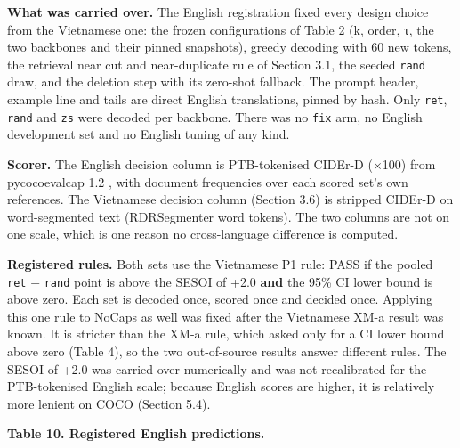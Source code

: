 \documentclass[manuscript,screen]{acmart}
\begin{document}
\textbf{What was carried over.} The English registration fixed every design choice from the
Vietnamese one: the frozen configurations of Table 2 (k, order, τ, the two backbones and their
pinned snapshots), greedy decoding with 60 new tokens, the retrieval near cut and near-duplicate
rule of Section 3.1, the seeded \texttt{rand} draw, and the deletion step with its zero-shot
fallback. The prompt header, example line and tails are direct English translations, pinned by hash.
Only \texttt{ret}, \texttt{rand} and \texttt{zs} were decoded per backbone. There was no
\texttt{fix} arm, no English development set and no English tuning of any kind.

\textbf{Scorer.} The English decision column is PTB-tokenised CIDEr-D (×100) from pycocoevalcap 1.2
\citep{Chen2015COCOCaptions}, with document frequencies over each scored set's own references. The
Vietnamese decision column (Section 3.6) is stripped CIDEr-D on word-segmented text (RDRSegmenter
word tokens). The two columns are not on one scale, which is one reason no cross-language difference
is computed.

\textbf{Registered rules.} Both sets use the Vietnamese P1 rule: PASS if the pooled \texttt{ret} −
\texttt{rand} point is above the SESOI of +2.0 \textbf{and} the 95\% CI lower bound is above zero.
Each set is decoded once, scored once and decided once. Applying this one rule to NoCaps as well was
fixed after the Vietnamese XM-a result was known. It is stricter than the XM-a rule, which asked
only for a CI lower bound above zero (Table 4), so the two out-of-source results answer different
rules. The SESOI of +2.0 was carried over numerically and was not recalibrated for the PTB-tokenised
English scale; because English scores are higher, it is relatively more lenient on COCO (Section
5.4).

\textbf{Table 10. Registered English predictions.}
\end{document}
